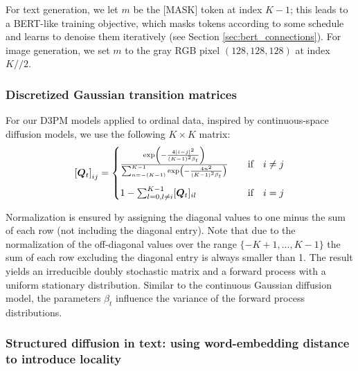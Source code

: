 For text generation, we let $m$ be the [MASK] token at index $K-1$; this leads to a BERT-like training objective, which masks tokens according to some schedule and learns to denoise them iteratively (see Section \ref{sec:bert_connections}). For image generation, we set $m$ to the gray RGB pixel $(128, 128, 128)$ at index $K//2$.


\subsubsection{Discretized Gaussian transition matrices}
\label{sec:appendix_transition_gaussian}

For our D3PM models applied to ordinal data, inspired by continuous-space diffusion models, we use the following $K \times K$ matrix:
\begin{align}
    \left[\boldsymbol{Q}_t\right]_{ij} = \begin{cases}
\frac{\exp\left(-\frac{4|i - j|^2 }{(K-1)^2\beta_t}\right)}{\sum_{n=-(K-1)}^{K-1}\exp\left(-\frac{4n^2 }{(K-1)^2\beta_t}\right)} \quad &\text{if} \quad i\neq j\\[1.5em]
1 - \sum_{l=0, l\neq i}^{K-1} [\boldsymbol{Q}_t]_{il} \quad &\text{if} \quad i = j \\
\end{cases}
    \label{eq:discretized_gaussian_mat}
\end{align}

Normalization is ensured by assigning the diagonal values to one minus the sum of each row (not including the diagonal entry). Note that due to the normalization of the off-diagonal values over the range $\{-K+1, ..., K-1\}$ the sum of each row excluding the diagonal entry is always smaller than 1. The result yields an irreducible doubly stochastic matrix and a forward process with a uniform stationary distribution. Similar to the continuous Gaussian diffusion model, the parameters $\beta_t$ influence the variance of the forward process distributions.

\subsubsection{Structured diffusion in text: using word-embedding distance to introduce locality}\label{sec:appendix_transition_nearest_neighbor}

